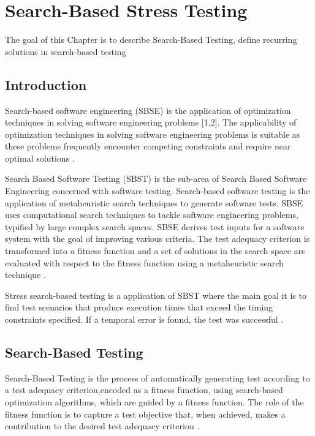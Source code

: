 \chapter{Search-Based Stress Testing}


The goal of this Chapter is to describe Search-Based Testing, define recurring solutions in search-based testing

\section{Introduction}

Search-based software engineering (SBSE) is the application of optimization techniques in solving software engineering problems [1,2]. The applicability of optimization techniques in solving software engineering problems is suitable as these problems frequently encounter competing constraints and require near optimal solutions \cite{Afzal2009a} \cite{Harman2015}. 


Search Based Software Testing (SBST) is the sub-area of Search Based Software Engineering concerned with software testing. Search-based software testing is the application of metaheuristic search techniques to generate software tests. SBSE uses computational search techniques to tackle software engineering problems, typified by large complex search spaces. SBSE derives test inputs for a software system with the goal of improving various criteria. The test adequacy criterion is transformed into a fitness function and a set of solutions in the search space are evaluated with respect to the fitness function using a metaheuristic search technique \cite{Afzal2009a} \cite{Aleti2016} \cite{Harman2015}.

Stress search-based testing is a application of SBST where the main goal it is to find test scenarios that produce execution times that exceed the timing constraints specified. If a temporal error is found, the test was successful \cite{Sullivan}.

\section{Search-Based Testing}

Search-Based Testing is the process of automatically
generating test according to a test adequacy criterion,encoded as a fitness function, using search-based optimization algorithms, which are guided by a fitness function. The role of the fitness function is to capture a test objective that, when achieved, makes a contribution to the desired test adequacy criterion \cite{Harman2010}. 

